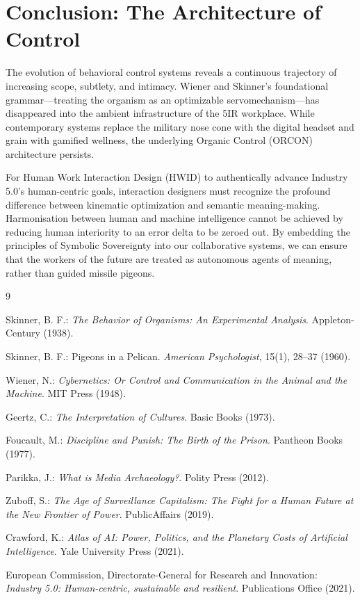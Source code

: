 \documentclass[11pt, a4paper]{article}
\begin{document}
\section{Conclusion: The Architecture of Control}

The evolution of behavioral control systems reveals a continuous trajectory of increasing scope, subtlety, and intimacy. Wiener and Skinner's foundational grammar---treating the organism as an optimizable servomechanism---has disappeared into the ambient infrastructure of the 5IR workplace. While contemporary systems replace the military nose cone with the digital headset and grain with gamified wellness, the underlying Organic Control (ORCON) architecture persists. 

For Human Work Interaction Design (HWID) to authentically advance Industry 5.0's human-centric goals, interaction designers must recognize the profound difference between kinematic optimization and semantic meaning-making. Harmonisation between human and machine intelligence cannot be achieved by reducing human interiority to an error delta to be zeroed out. By embedding the principles of Symbolic Sovereignty into our collaborative systems, we can ensure that the workers of the future are treated as autonomous agents of meaning, rather than guided missile pigeons.

\begin{thebibliography}{9}

Skinner, B. F.: \textit{The Behavior of Organisms: An Experimental Analysis}. Appleton-Century (1938).

Skinner, B. F.: Pigeons in a Pelican. \textit{American Psychologist}, 15(1), 28--37 (1960).

Wiener, N.: \textit{Cybernetics: Or Control and Communication in the Animal and the Machine}. MIT Press (1948).

Geertz, C.: \textit{The Interpretation of Cultures}. Basic Books (1973).

Foucault, M.: \textit{Discipline and Punish: The Birth of the Prison}. Pantheon Books (1977).

Parikka, J.: \textit{What is Media Archaeology?}. Polity Press (2012).

Zuboff, S.: \textit{The Age of Surveillance Capitalism: The Fight for a Human Future at the New Frontier of Power}. PublicAffairs (2019).

Crawford, K.: \textit{Atlas of AI: Power, Politics, and the Planetary Costs of Artificial Intelligence}. Yale University Press (2021).

European Commission, Directorate-General for Research and Innovation: \textit{Industry 5.0: Human-centric, sustainable and resilient}. Publications Office (2021).

\end{thebibliography}
\end{document}
